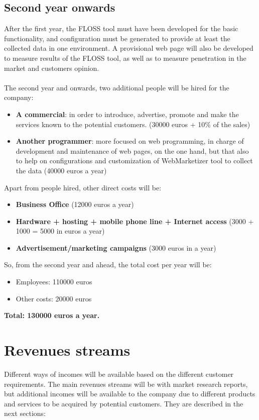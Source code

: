 \documentclass[11pt]{article}
\begin{document}
\subsection{Second year onwards}
After the first year, the FLOSS tool must have been developed for the basic functionality, and configuration must be generated to provide at least the collected data in one environment. A provisional web page will also be developed to measure results of the FLOSS tool, as well as to measure penetration in the market and customers opinion.\\
\\
The second year and onwards, two additional people will be hired for the company:
\begin{itemize}
\item{\textbf{A commercial}}: in order to introduce, advertise, promote and make the services known to the potential customers. (30000 euros + 10\% of the sales)
\item{\textbf{Another programmer}}: more focused on web programming, in charge of development and maintenance of web pages, on the one hand, but that also to help on configurations and customization of WebMarketizer tool to collect the data (40000 euros a year)
\end{itemize}
Apart from people hired, other direct costs will be:
\begin{itemize}
\item{\textbf{Business Office}} (12000 euros a year)
\item{\textbf{Hardware + hosting + mobile phone line + Internet access}} (3000 + 1000 = 5000 in euros a year)
\item{\textbf{Advertisement/marketing campaigns}} (3000 euros in a year)
\end{itemize}
So, from the second year and ahead, the total cost per year will be:
\begin{itemize}
\item{Employees}: 110000 euros
\item{Other costs}: 20000 euros
\end{itemize}
\textbf{Total: 130000 euros a year.}
\section{Revenues streams}
Different ways of incomes will be available based on the different customer requirements. The main revenues streams will be with market research reports, but additional incomes will be available to the company due to different products and services to be acquired by potential customers. They are described in the next sections:
\end{document}
